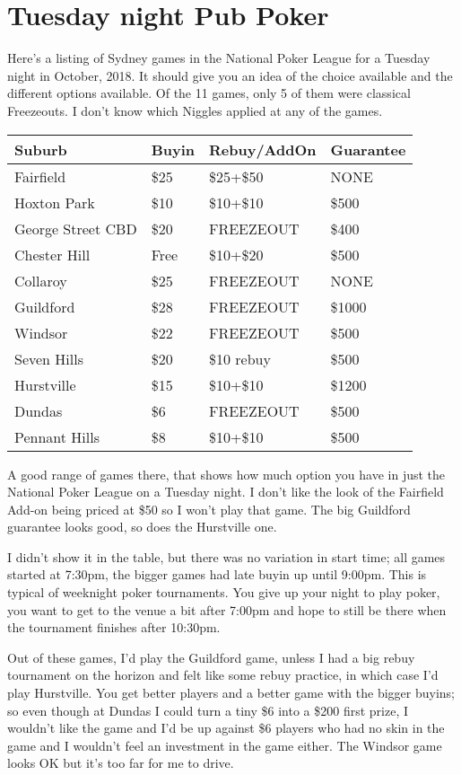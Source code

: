 \section{Tuesday night Pub Poker}

Here's a listing of Sydney games in the National Poker League
for a Tuesday night in October, 2018. It should give you an
idea of the choice available and the different options available.
Of the 11 games, only 5 of them were classical Freezeouts.
I don't know which Niggles applied at any of the games.


\begin{tabular}{|l|l|l|l|} \hline
Suburb & Buyin & Rebuy/AddOn & Guarantee \\ \hline
Fairfield        & \$25 & \$25+\$50 & NONE \\ \hline
Hoxton Park       & \$10 & \$10+\$10 & \$500 \\ \hline
George Street CBD & \$20 & FREEZEOUT & \$400 \\ \hline
Chester Hill & Free & \$10+\$20 & \$500 \\ \hline
Collaroy & \$25 & FREEZEOUT & NONE \\ \hline
Guildford & \$28 & FREEZEOUT & \$1000 \\ \hline
Windsor & \$22 & FREEZEOUT & \$500 \\ \hline
Seven Hills & \$20 & \$10 rebuy & \$500 \\ \hline
Hurstville & \$15 & \$10+\$10 & \$1200 \\ \hline
Dundas & \$6 & FREEZEOUT & \$500 \\ \hline
Pennant Hills & \$8 & \$10+\$10 & \$500 \\ \hline
\end{tabular}

A good range of games there, that shows how much option you
have in just the National Poker League on a Tuesday night.
I don't like the look of the Fairfield Add-on being priced at \$50
so I won't play that game. The big Guildford guarantee looks
good, so does the Hurstville one.

I didn't show it in the table, but there was no variation in start
time; all games started at 7:30pm, the bigger games had late buyin
up until 9:00pm. This is typical of weeknight poker
tournaments. You give up your night to play poker,
you want to get to the venue a bit after 7:00pm and hope to still
be there when the tournament finishes after 10:30pm.

Out of these games, I'd play the Guildford game, unless I had a big
rebuy tournament on the horizon and felt like some rebuy practice, in
which case I'd play Hurstville. You get better players and a better
game with the bigger buyins; so even though at Dundas I could turn a
tiny \$6 into a \$200 first prize, I wouldn't like the game and I'd be
up against \$6 players who had no skin in the game
and I wouldn't feel an investment in the game either. The Windsor game
looks OK but it's too far for me to drive.

